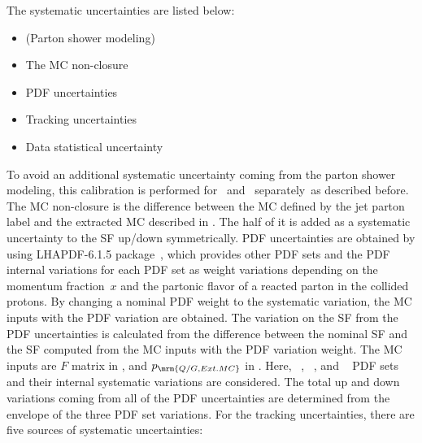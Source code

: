 The systematic uncertainties are listed below:
\begin{itemize}
  \item (Parton shower modeling)
  \item The MC non-closure
  \item PDF uncertainties
  \item Tracking uncertainties
  \item Data statistical uncertainty
\end{itemize}
To avoid an additional systematic uncertainty coming from the parton shower modeling, %
this calibration is performed for ~and \sherpa~separately~as described before. %
The MC non-closure is the difference between the MC defined by the jet parton label and the extracted MC described in . %
The half of it is added as a systematic uncertainty to the SF up/down symmetrically. %
PDF uncertainties are obtained by using \textsc{LHAPDF-6.1.5} package~\cite{LHAPDF}, which provides other PDF sets and the PDF internal variations for each PDF set %
as weight variations depending on the momentum fraction~$x$ and the partonic flavor of a reacted parton in the collided protons. %
By changing a nominal PDF weight to the systematic variation, %
the MC inputs with the PDF variation are obtained. %
The variation on the SF from the PDF uncertainties is calculated from the difference between the nominal SF and %
the SF computed from the MC inputs with the PDF variation weight. %
The MC inputs are $F$ matrix in , and $p_{\mrm{Q/G, Ext. MC}}$ in . %
Here, \nnpdf~\cite{NNPDF30}, \ctten~\cite{CT10}, and \mmht~\cite{MMHT2014} PDF sets and their internal systematic variations are considered. %
The total up and down variations coming from all of the PDF uncertainties are determined from the envelope of the three PDF set variations. %
For the tracking uncertainties, there are five sources of systematic uncertainties: %
